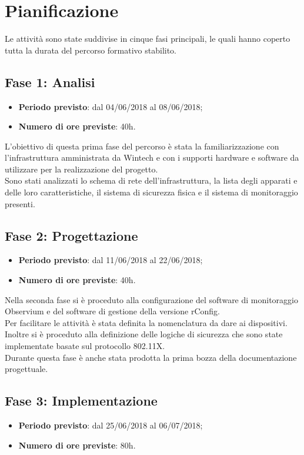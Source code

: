 \documentclass[Tesi.tex]{subfiles}
\begin{document}
\chapter{Pianificazione}
Le attività sono state suddivise in cinque fasi principali, le quali hanno coperto tutta la durata del percorso formativo stabilito.

\section{Fase 1: Analisi}
\begin{itemize}
	\item \textbf{Periodo previsto}: dal 04/06/2018 al 08/06/2018;
	\item \textbf{Numero di ore previste}: 40h.
\end{itemize}

L'obiettivo di questa prima fase del percorso è stata la familiarizzazione con l'infrastruttura amministrata da Wintech e con i supporti hardware e software da utilizzare per la realizzazione del progetto. \\
Sono stati analizzati lo schema di rete dell'infrastruttura, la lista degli apparati e delle loro caratteristiche, il sistema di sicurezza fisica e il sistema di monitoraggio presenti. 

\section{Fase 2: Progettazione}
\begin{itemize}
	\item \textbf{Periodo previsto}: dal 11/06/2018 al 22/06/2018;
	\item \textbf{Numero di ore previste}: 40h.
\end{itemize}
	
Nella seconda fase si è proceduto alla configurazione del software di monitoraggio Observium e del software di gestione della versione rConfig. \\
Per facilitare le attività è stata definita la nomenclatura da dare ai dispositivi.\\
Inoltre si è proceduto alla definizione delle logiche di sicurezza che sono state implementate basate sul protocollo 802.11X. \\
Durante questa fase è anche stata prodotta la prima bozza della documentazione progettuale.
	

\section{Fase 3: Implementazione}
\begin{itemize}
	\item \textbf{Periodo previsto}: dal 25/06/2018 al 06/07/2018;
	\item \textbf{Numero di ore previste}: 80h.
\end{itemize}
	
\end{document}

